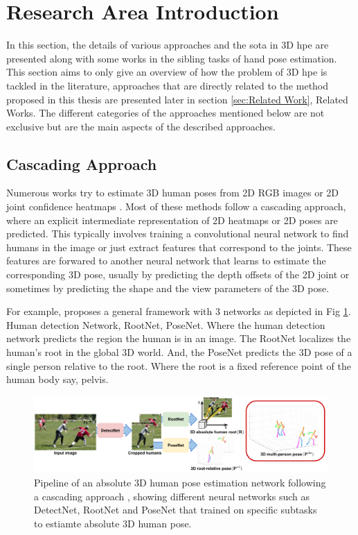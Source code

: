 \section{Research Area Introduction}
\label{sec:Research area introduction}

In this section, the details of various approaches and the \ac{sota} in 3D \ac{hpe} are presented along with some works in the sibling tasks of hand pose estimation. This section aims to only give an overview of how the problem of 3D \ac{hpe} is tackled in the literature, approaches that are directly related to the method proposed in this thesis are presented later in section \ref{sec:Related Work}, Related Works. The different categories of the approaches mentioned below are not exclusive but are the main aspects of the described approaches.

\subsection{Cascading Approach}

Numerous works try to estimate 3D human poses from 2D RGB images or 2D joint confidence heatmaps \cite{CameraDistanceAware, poselifter, DistillNRSfM, occlusionVideo, ordinalranking}. Most of these methods follow a cascading approach, where an explicit intermediate representation of 2D heatmaps or 2D poses are predicted. This typically involves training a convolutional neural network to find humans in the image or just extract features that correspond to the joints. These features are forwared to another neural network that learns to estimate the corresponding 3D pose, usually by predicting the depth offsets of the 2D joint or sometimes by predicting the shape and the view parameters of the 3D pose.

For example, \cite{CameraDistanceAware} proposes a general framework with 3 networks as depicted in Fig \ref{fig:CameraDistanceAware}. Human detection Network, RootNet, PoseNet. Where the human detection network predicts the region the human is in an image. The RootNet localizes the human's root in the global 3D world. And, the PoseNet predicts the 3D pose of a single person relative to the root. Where the root is a fixed reference point of the human body say, pelvis.

\begin{figure}[h]
    \centering
    \includegraphics[width=\linewidth]{figures/background/cascading_arch.pdf}
    \caption{Pipeline of an absolute 3D human pose estimation network following a cascading approach \cite{CameraDistanceAware}, showing different neural networks such as DetectNet, RootNet and PoseNet that trained on specific subtasks to estiamte absolute 3D human pose.}
    \label{fig:CameraDistanceAware}
\end{figure}

